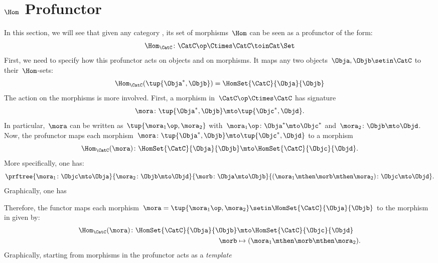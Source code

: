 
\section{$\Hom$ Profunctor}

In this section, we will see that given any category \CatC, its set of morphisms~$\Hom$ can be seen as a profunctor of the form:
\begin{equation}
    \label{eq:hom-signature}
    \Hom_\CatC\colon \CatC \op \Ctimes \CatC \toinCat \Set
\end{equation}
First, we need to specify how this profunctor acts on objects and on morphisms.
It maps any two objects~$\Obja,\Objb\setin \CatC$ to their~$\Hom$-sets:
\begin{equation}
    \label{eq:hom-action}
    \Hom_\CatC(\tup{\Obja^*,\Objb})=\HomSet{\CatC}{\Obja}{\Objb}
\end{equation}
The action on the morphisms is more involved.
First, a morphism in~$\CatC\op \Ctimes \CatC$ has signature
%
\begin{equation}
    \label{eq:hom0}
    \mora \colon \tup{\Obja^*,\Objb}\mto \tup{\Objc^*, \Objd}.
\end{equation}
%
In particular,~$\mora$ can be written as~$\tup{\mora_1\op,\mora_2}$ with~$\mora_1\op\colon \Obja^*\mto \Objc^*$ and~$\mora_2\colon \Objb\mto \Objd$.
Now, the profunctor maps each morphism~$\mora \colon \tup{\Obja^*,\Objb}\mto \tup{\Objc^*, \Objd}$ to a morphism
%
\begin{equation}
    \label{eq:hom2}
    \Hom_\CatC(\mora)\colon \HomSet{\CatC}{\Obja}{\Objb}\mto \HomSet{\CatC}{\Objc}{\Objd}.
\end{equation}
%
More specifically, one has:
%
\begin{equation}
    \label{eq:hom3}
    \prftree{
        \mora_1\colon \Objc \mto \Obja
    }{
        \mora_2\colon \Objb\mto \Objd
    }{
        \morb\colon \Obja\mto \Objb
    }{
        (\mora_1\mthen \morb \mthen \mora_2)\colon \Objc\mto \Objd
    }.
\end{equation}
%
Graphically, one has
\begin{center}
\end{center}
%
Therefore, the functor maps each morphism~$\mora=\tup{\mora_1\op,\mora_2}\setin \HomSet{\CatC}{\Obja}{\Objb}$ to the morphism in \Set given by:
%
\begin{equation}
    \label{eq:hom4}
    \begin{aligned}
        \Hom_\CatC(\mora)\colon \HomSet{\CatC}{\Obja}{\Objb} & \mto \HomSet{\CatC}{\Objc}{\Objd} \\
        \morb                                                & \mapsto (\mora_1\mthen \morb \mthen \mora_2).
    \end{aligned}
\end{equation}
%
Graphically, starting from morphisms in \CatC
%
%
the profunctor acts as a \emph{template}
%

